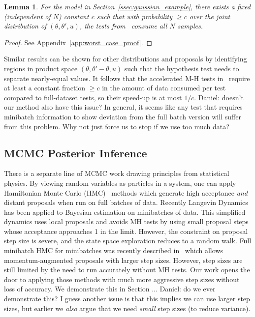 \documentclass{article}
\newtheorem{lemma}{Lemma}
\begin{document}
\begin{lemma}\label{lem:worst_case}
    For the model in Section~\ref{ssec:gaussian_example}, there exists a fixed
    (independent of $N$) constant $c$ such that with probability $\geq c$ over
    the joint distribution of $(\theta, \theta', u)$, the tests
    from~\cite{cutting_mh_2014,icml2014c1_bardenet14} consume all $N$ samples. 
\end{lemma}

\begin{proof}
See Appendix~\ref{app:worst_case_proof}.
\end{proof}

Similar results can be shown for other distributions and proposals by
identifying regions in product space $(\theta,\theta'-\theta,u)$ such that the
hypothesis test needs to separate nearly-equal values.  It follows that the
accelerated M-H tests in~\cite{cutting_mh_2014,icml2014c1_bardenet14} require at
least a constant fraction $\geq c$ in the amount of data consumed per test
compared to full-dataset tests, so their speed-up is at most $1/c$.
{\color{blue} Daniel: doesn't our method also have this issue? In general, it
seems like any test that requires minibatch information to show deviation from
the full batch version will suffer from this problem. Why not just force us to
stop if we use too much data?}

\subsection{MCMC Posterior Inference}
There is a separate line of MCMC work drawing principles from statistical
physics. By viewing random variables as particles in a system, one can apply
Hamiltonian Monte Carlo (HMC)~\cite{mcmc_hamiltonian_2010} methods which
generate high acceptance \emph{and} distant proposals when run on full batches
of data. Recently Langevin Dynamics~\cite{langevin_2011,conf/icml/AhnBW12} has
been applied to Bayesian estimation on minibatches of data. This simplified
dynamics uses local proposals and avoids MH tests by using small proposal steps
whose acceptance approaches 1 in the limit. However, the constraint on proposal
step size is severe, and the state space exploration reduces to a random walk.
Full minibatch HMC for minibatches was recently described in~\cite{sghmc_2014}
which allows momentum-augmented proposals with larger step sizes. However, step
sizes are still limited by the need to run accurately without MH tests.  Our
work opens the door to applying those methods with much more aggressive step
sizes without loss of accuracy. We demonstrate this in Section ... {\color{blue}
Daniel: do we ever demonstrate this? I guess another issue is that this implies
we can use larger step sizes, but earlier we \emph{also} argue that we need
\emph{small} step sizes (to reduce variance).}
\end{document}
